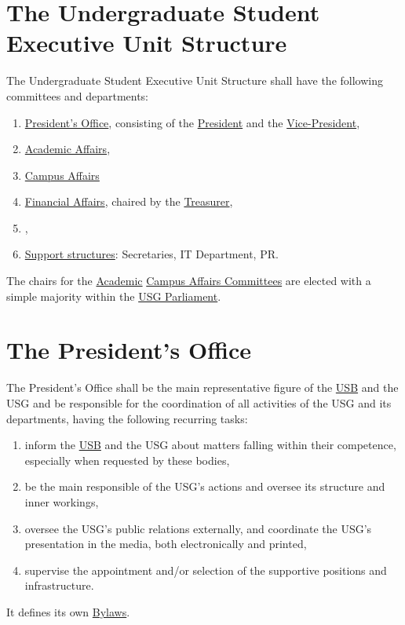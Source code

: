 \label{USGexecutiveUnitDef}

\section{The Undergraduate Student Executive Unit Structure} 
\label{USGstructure}
The Undergraduate Student Executive Unit Structure shall have the following committees and departments:
\begin{enumerate}
\item \hyperref[PresidentOfficeDef]{President's Office}, consisting of the \hyperref[PresDef]{President} and the \hyperref[VPDef]{Vice-President},
\item \hyperref[AACdef]{Academic Affairs},
\item \hyperref[CACdef]{Campus Affairs}
\item \hyperref[Financesdef]{Financial Affairs}, chaired by the \hyperref[TreasurerDef]{Treasurer},
\item \hyperref[IACdef]{},
\item \hyperref[suppstrucdef]{Support structures}: Secretaries, IT Department, PR.
\end{enumerate}
The chairs for the \hyperref[AACdef]{Academic}\add[S]{, } \hyperref[CACdef]{Campus Affairs Committees}\hyperref[IACdef]{} are elected with a simple majority within the \hyperref[USGParliamentDef]{USG Parliament}.


\section{The President's Office} 
\label{PresidentOfficeDef}
The President's Office shall be the main representative figure of the \hyperref[studentbody]{USB} and the USG and be responsible for the coordination of all activities of the USG and its departments, having the following recurring tasks:
\begin{enumerate}
\item {} inform the \hyperref[studentbody]{USB} and the USG about matters falling within their competence, especially when requested by these bodies,
\item be the main responsible of the USG's actions and oversee its structure and inner workings,
\item oversee the USG's public relations externally, and coordinate the USG's presentation in the media, both electronically and printed,
\item supervise the appointment and/or selection of the supportive positions and infrastructure.
\end{enumerate}
It defines its own \hyperref[PresByLawsDef]{Bylaws}.

